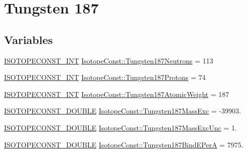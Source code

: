 \hypertarget{group___isotope_const-_tungsten-_w187}{}\section{Tungsten 187}
\label{group___isotope_const-_tungsten-_w187}
\subsection*{Variables}
\begin{DoxyCompactItemize}
\item 
\mbox{\hyperlink{group___isotope_const-_macros_ga5f18360b3e99483a35c32d789e62621c}{I\+S\+O\+T\+O\+P\+E\+C\+O\+N\+S\+T\+\_\+\+I\+NT}} \mbox{\hyperlink{group___isotope_const-_tungsten-_w187_gafefc037824f28e84dcf1475008cf645f}{Isotope\+Const\+::\+Tungsten187\+Neutrons}} = 113
\item 
\mbox{\hyperlink{group___isotope_const-_macros_ga5f18360b3e99483a35c32d789e62621c}{I\+S\+O\+T\+O\+P\+E\+C\+O\+N\+S\+T\+\_\+\+I\+NT}} \mbox{\hyperlink{group___isotope_const-_tungsten-_w187_ga2e05c50189166ddaf0b5649d0f334067}{Isotope\+Const\+::\+Tungsten187\+Protons}} = 74
\item 
\mbox{\hyperlink{group___isotope_const-_macros_ga5f18360b3e99483a35c32d789e62621c}{I\+S\+O\+T\+O\+P\+E\+C\+O\+N\+S\+T\+\_\+\+I\+NT}} \mbox{\hyperlink{group___isotope_const-_tungsten-_w187_ga3c36768a2fe926f145694e9f62b0d267}{Isotope\+Const\+::\+Tungsten187\+Atomic\+Weight}} = 187
\item 
\mbox{\hyperlink{group___isotope_const-_macros_ga8f45a7272ce02c0b4c65c44636ed719a}{I\+S\+O\+T\+O\+P\+E\+C\+O\+N\+S\+T\+\_\+\+D\+O\+U\+B\+LE}} \mbox{\hyperlink{group___isotope_const-_tungsten-_w187_gabae4008d5c4ffe45b0cd6d77f7976b3b}{Isotope\+Const\+::\+Tungsten187\+Mass\+Exc}} = -\/39903.
\item 
\mbox{\hyperlink{group___isotope_const-_macros_ga8f45a7272ce02c0b4c65c44636ed719a}{I\+S\+O\+T\+O\+P\+E\+C\+O\+N\+S\+T\+\_\+\+D\+O\+U\+B\+LE}} \mbox{\hyperlink{group___isotope_const-_tungsten-_w187_ga778730437ee2ca264885164b12385a6d}{Isotope\+Const\+::\+Tungsten187\+Mass\+Exc\+Unc}} = 1.
\item 
\mbox{\hyperlink{group___isotope_const-_macros_ga8f45a7272ce02c0b4c65c44636ed719a}{I\+S\+O\+T\+O\+P\+E\+C\+O\+N\+S\+T\+\_\+\+D\+O\+U\+B\+LE}} \mbox{\hyperlink{group___isotope_const-_tungsten-_w187_ga815ce1304b1e0d02713c25ef73ca1e57}{Isotope\+Const\+::\+Tungsten187\+Bind\+E\+PerA}} = 7975.
\item 

\end{DoxyCompactItemize}
